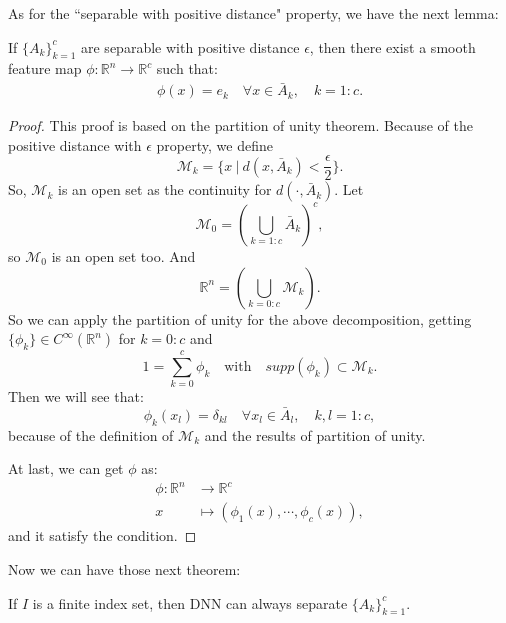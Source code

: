 As for the ``separable with positive distance" property, we have the next lemma:
\begin{lemma}If $\{A_k\}_{k=1}^c$ are separable with positive distance $\epsilon$, then there exist a smooth feature map $\phi: \mathbb{R}^n \to \mathbb{R}^c$ such that:
\begin{align}
\phi(x) = e_k \quad \forall x \in \bar{A}_k,\quad k = 1:c.
\end{align}
\end{lemma}
\begin{proof}This proof is based on the partition of unity theorem. Because of the positive distance with $\epsilon$ property, we define 
\begin{equation}
\mathcal{M}_k = \{x ~|~ d(x, \bar{A}_k) < \frac{\epsilon}{2}\}.
\end{equation}
So, $\mathcal{M}_k$ is an open set as the continuity for $d(\cdot, \bar{A}_k)$. Let 
\begin{equation}
\mathcal{M}_0 = (\bigcup_{k=1:c} \bar{A}_k)^c,
\end{equation}
so $\mathcal{M}_0$ is an open set too. And 
\begin{equation}
\mathbb{R}^n = (\bigcup_{k=0:c} \mathcal{M}_k).
\end{equation}
So we can apply the partition of unity for the above decomposition, getting $\{\phi_k\} \in C^{\infty}(\mathbb{R}^n)$ for $k = 0:c$ and 
\begin{equation}
1 = \sum_{k=0}^c \phi_k \quad \text{with} \quad supp(\phi_k) \subset \mathcal{M}_k.
\end{equation}
Then we will see that:
\begin{equation}
\phi_k(x_l) = \delta_{kl} \quad \forall x_l \in \bar{A}_l, \quad k, l = 1:c,
\end{equation}
because of the definition of $\mathcal{M}_k$ and the results of partition of unity.

At last, we can get $\phi$ as:
\begin{align}
\phi: \mathbb{R}^n &\to \mathbb{R}^c \\
 x &\mapsto (\phi_1(x), \cdots, \phi_c(x)),
\end{align}
and it satisfy the condition.
\end{proof}

Now we can have those next theorem:
\begin{theorem}
If $I$ is a finite index set, then DNN can always separate $\{A_k\}_{k=1}^c$.
\end{theorem}

